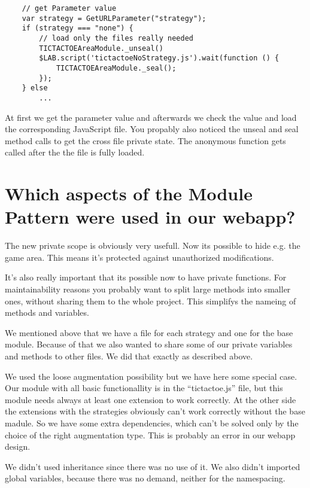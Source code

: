 \documentclass{bioinfo}
\begin{document}
\begin{lstlisting}
    // get Parameter value
    var strategy = GetURLParameter("strategy");
    if (strategy === "none") {
        // load only the files really needed
        TICTACTOEAreaModule._unseal()
        $LAB.script('tictactoeNoStrategy.js').wait(function () {
            TICTACTOEAreaModule._seal();
        });
    } else
        ...
\end{lstlisting}

At first we get the parameter value and afterwards we check the value and load the
corresponding JavaScript file. You propably also noticed the unseal and seal method calls
to get the cross file private state. The anonymous function gets called after the
the file is fully loaded.

\section{Which aspects of the Module Pattern were used in our webapp?}
The new private scope is obviously very usefull. Now its possible to hide e.g. the
game area. This means it's protected against unauthorized modifications.

It's also really important that its possible now to have private functions. For maintainability
reasons you probably want to split large methods into smaller ones, without sharing them
to the whole project. This simplifys the nameing of methods and variables. \vspace{\baselineskip}

We mentioned above that we have a file for each strategy and one for the base module.
Because of that we also wanted to share some of our private variables and methods to
other files. We did that exactly as described above.

We used the loose augmentation possibility but we have here some special case.
Our module with all basic functionallity is in the ``tictactoe.js'' file, but this module needs
always at least one extension to work correctly. At the other side the extensions with the strategies
obviously can't work correctly without the base madule. So we have some extra dependencies,
which can't be solved only by the choice of the right augmentation type. This is probably
an error in our webapp design.

We didn't used inheritance since there was no use of it. We also didn't imported global variables,
because there was no demand, neither for the namespacing.

\end{document}
